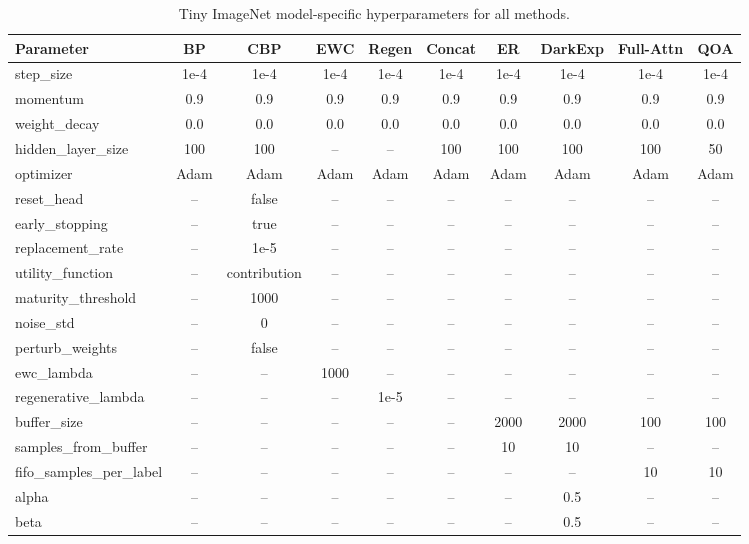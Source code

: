 \documentclass{article}
\begin{document}
\begin{table}[!ht]

\setlength{\abovecaptionskip}{2pt}
\setlength{\belowcaptionskip}{2pt}

\caption{Tiny ImageNet model-specific hyperparameters for all methods.}
\label{tab:tiny_model_specs}

\centering
\scriptsize
\setlength{\tabcolsep}{2pt}

\begin{tabular}{lccccccccc}
\toprule
\textbf{Parameter} & \textbf{BP} & \textbf{CBP} & \textbf{EWC} & \textbf{Regen} & \textbf{Concat} & \textbf{ER} & \textbf{DarkExp} & \textbf{Full-Attn} & \textbf{QOA} \\
\midrule
step\_size          & 1e-4 & 1e-4 & 1e-4 & 1e-4 & 1e-4 & 1e-4 & 1e-4 & 1e-4 & 1e-4 \\
momentum            & 0.9  & 0.9  & 0.9  & 0.9  & 0.9  & 0.9  & 0.9  & 0.9  & 0.9  \\
weight\_decay       & 0.0  & 0.0  & 0.0  & 0.0  & 0.0  & 0.0  & 0.0  & 0.0  & 0.0  \\
hidden\_layer\_size & 100  & 100  & --   & --   & 100  & 100  & 100  & 100  & 50   \\
optimizer           & Adam & Adam & Adam & Adam & Adam & Adam & Adam & Adam & Adam \\
\midrule
reset\_head         & --   & false & --  & --   & --   & --   & --   & --   & --   \\
early\_stopping     & --   & true  & --  & --   & --   & --   & --   & --   & --   \\
replacement\_rate   & --   & 1e-5  & --  & --   & --   & --   & --   & --   & --   \\
utility\_function   & --   & contribution & -- & -- & -- & -- & -- & -- & -- \\
maturity\_threshold & --   & 1000  & --  & --   & --   & --   & --   & --   & --   \\
noise\_std          & --   & 0     & --  & --   & --   & --   & --   & --   & --   \\
perturb\_weights    & --   & false & --  & --   & --   & --   & --   & --   & --   \\
\midrule
ewc\_lambda         & --   & --    & 1000 & --  & --   & --   & --   & --   & --   \\
regenerative\_lambda& --   & --    & --   & 1e-5 & --  & --   & --   & --   & --   \\
\midrule
buffer\_size        & --   & --    & --   & --   & --   & 2000 & 2000 & 100  & 100  \\
samples\_from\_buffer & -- & --    & --   & --   & --   & 10   & 10   & --   & --   \\
fifo\_samples\_per\_label & -- & -- & --  & --   & --   & --   & --   & 10   & 10   \\
\midrule
alpha               & --   & --    & --   & --   & --   & --   & 0.5  & --   & --   \\
beta                & --   & --    & --   & --   & --   & --   & 0.5  & --   & --   \\
\bottomrule
\end{tabular}

\end{table}
\end{document}
